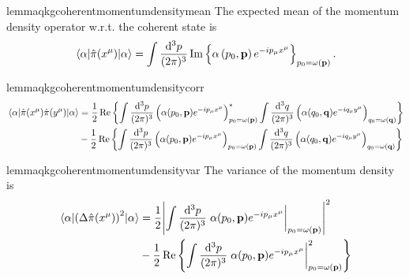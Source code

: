 \begin{restatable}{lemma}{qkgcoherentmomentumdensitymean}\label{thm:qkg_coherent_momentum_density_mean}
	The expected mean of the momentum density operator w.r.t. the coherent state is
	\begin{equation}
		\expval{\hat\pi(x^\mu)}{\alpha}
		=
		\int\frac{\dd[3]{p}}{(2\pi)^3}
		\operatorname{\operatorname{Im}}\left\{
			\alpha\left(p_0,\vb{p}\right)
			e^{-ip_\mu x^\mu}	
		\right\}_{p_0=\omega(\vb{p})}
		.
	\end{equation}
\end{restatable}
\begin{restatable}{lemma}{qkgcoherentmomentumdensitycorr}\label{thm:qkg_coherent_momentum_density_corr}
	\begin{equation}
		\begin{split}
			\expval{\hat\pi(x^\mu)\hat\pi(y^\mu)}{\alpha}
			&=
			\frac{1}{2}
			\operatorname{\operatorname{Re}}\left\{
				\int\frac{\dd[3]{p}}{(2\pi)^3}
				\left(
					\alpha(p_0,\vb{p})
					e^{-ip_\mu x^\mu}
				\right)^*_{p_0=\omega(\vb{p})}
				\int\frac{\dd[3]{q}}{(2\pi)^3}
				\left(
					\alpha(q_0,\vb{q})
					e^{-iq_\mu y^\mu}
				\right)_{q_0=\omega(\vb{q})}			
			\right\}
			\\
			&-
			\frac{1}{2}
			\operatorname{\operatorname{Re}}\left\{
				\int\frac{\dd[3]{p}}{(2\pi)^3}
				\left(
					\alpha(p_0,\vb{p})
					e^{-ip_\mu x^\mu}
				\right)_{p_0=\omega(\vb{p})}
				\int\frac{\dd[3]{q}}{(2\pi)^3}
				\left(
					\alpha(q_0,\vb{q})
					e^{-iq_\mu y^\mu}
				\right)_{q_0=\omega(\vb{q})}
			\right\}
		\end{split}
	\end{equation}
\end{restatable}
\begin{restatable}{lemma}{qkgcoherentmomentumdensityvar}\label{thm:qkg_coherent_momentum_density_var}
	The variance of the momentum density is
	\begin{equation}
		\begin{split}
			\expval{\left(\Delta\hat\pi(x^\mu)\right)^2}{\alpha}
			&=
			\frac{1}{2}
			\abs{
				\int\frac{\dd[3]{p}}{(2\pi)^3}
				\eval{
					\alpha(p_0,\vb{p})
					e^{-ip_\mu x^\mu}
				}_{p_0=\omega(\vb{p})}
			}^2
			\\
			&-
			\frac{1}{2}
			\Re\left\{
				\int\frac{\dd[3]{p}}{(2\pi)^3}
				\eval{
					\alpha(p_0,\vb{p})
					e^{-ip_\mu x^\mu}
				}_{p_0=\omega(\vb{p})}^2
			\right\}
		\end{split}
	\end{equation}
\end{restatable}